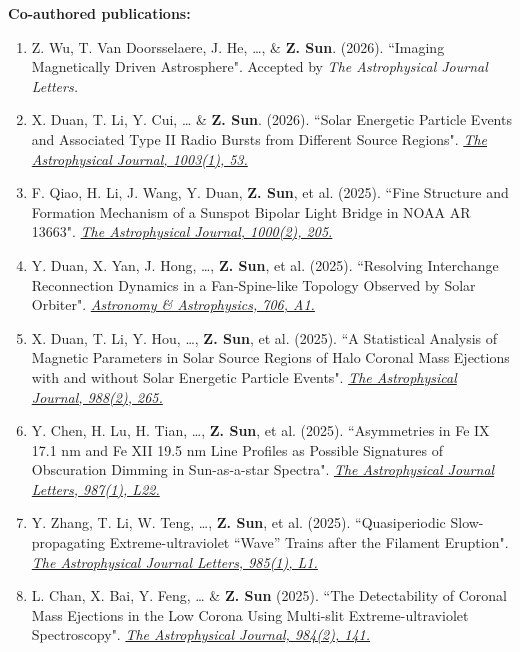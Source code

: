 \documentclass{resume}
\begin{document}
\begin{enumerate}
\end{enumerate}


\textbf{Co-authored publications:}
\begin{enumerate}[start=11]
\item Z. Wu, T. Van Doorsselaere, J. He, …, \& \textbf{Z. Sun}. (2026). ``Imaging Magnetically Driven Astrosphere". Accepted by \textit{The Astrophysical Journal Letters.}
\item X. Duan, T. Li, Y. Cui, … \& \textbf{Z. Sun}. (2026). ``Solar Energetic Particle Events and Associated Type II Radio Bursts from Different Source Regions". \href{https://iopscience.iop.org/article/10.3847/1538-4357/ae63bb}{\textit{The Astrophysical Journal, 1003(1), 53.}}
\item F. Qiao, H. Li, J. Wang, Y. Duan, \textbf{Z. Sun}, et al. (2025). ``Fine Structure and Formation Mechanism of a Sunspot Bipolar Light Bridge in NOAA AR 13663". \href{https://iopscience.iop.org/article/10.3847/1538-4357/ae4bd9}{\textit{The Astrophysical Journal, 1000(2), 205.}}
\item Y. Duan, X. Yan, J. Hong, …, \textbf{Z. Sun}, et al. (2025). ``Resolving Interchange Reconnection Dynamics in a Fan-Spine-like Topology Observed by Solar Orbiter". \href{https://www.aanda.org/articles/aa/abs/2026/02/aa57158-25/aa57158-25.html}{\textit{Astronomy \& Astrophysics, 706, A1.}}
\item X. Duan, T. Li, Y. Hou, …, \textbf{Z. Sun}, et al. (2025). ``A Statistical Analysis of Magnetic Parameters in Solar Source Regions of Halo Coronal Mass Ejections with and without Solar Energetic Particle Events". \href{https://iopscience.iop.org/article/10.3847/1538-4357/ade9af}{\textit{The Astrophysical Journal, 988(2), 265.}}
\item Y. Chen, H. Lu, H. Tian, …, \textbf{Z. Sun}, et al. (2025). ``Asymmetries in Fe IX 17.1 nm and Fe XII 19.5 nm Line Profiles as Possible Signatures of Obscuration Dimming in Sun-as-a-star Spectra". \href{https://iopscience.iop.org/article/10.3847/2041-8213/ade685}{\textit{The Astrophysical Journal Letters, 987(1), L22.}}
\item Y. Zhang, T. Li, W. Teng, …, \textbf{Z. Sun}, et al. (2025). ``Quasiperiodic Slow-propagating Extreme-ultraviolet “Wave” Trains after the Filament Eruption". \href{https://iopscience.iop.org/article/10.3847/2041-8213/add33b}{\textit{The Astrophysical Journal Letters, 985(1), L1.}}
\item L. Chan, X. Bai, Y. Feng, … \& \textbf{Z. Sun} (2025). ``The Detectability of Coronal Mass Ejections in the Low Corona Using Multi-slit Extreme-ultraviolet Spectroscopy". \href{https://iopscience.iop.org/article/10.3847/1538-4357/adc10a}{\textit{The Astrophysical Journal, 984(2), 141.}}

\end{enumerate}
\end{document}

